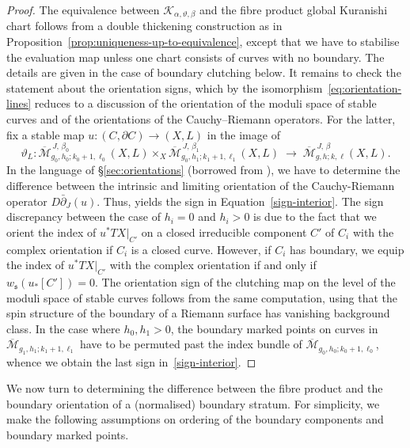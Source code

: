 \documentclass[11pt,psamsfonts, oneside, reqno]{amsart}
\newcommand{\cl}{\colon}
\newcommand{\Mbar}{\overline{\mathcal M}}
\newcommand{\delbar}{\bar\partial}
\newcommand{\del}{\partial}
\newcommand{\cK}{\mathcal{K}}
\newcommand{\fs}{\mathfrak{s}}
\theoremstyle{definition}
\theoremstyle{remark}
\numberwithin{equation}{section}
\begin{document}
\begin{proof} 
	The equivalence between $\cK_{\alpha,\vartheta,\beta}$ and the fibre product global Kuranishi chart follows from a double thickening construction as in Proposition~\ref{prop:uniqueness-up-to-equivalence}, except that we have to stabilise the evaluation map unless one chart consists of curves with no boundary. The details are given in the case of boundary clutching below. It remains to check the statement about the orientation signs, which by the isomorphism~\eqref{eq:orientation-lines} reduces to a discussion of the orientation of the moduli space of stable curves and of the orientations of the Cauchy--Riemann operators. For the latter, fix a stable map $u \cl (C,\del C)\to (X,L)$ in the image of 
	$$ \vartheta_L\cl \Mbar_{g_0,h_0;k_0+1,\ell_0}^{\,J,\,\beta_0}(X,L)\times_X\Mbar_{g_0,h_1;k_1+1,\ell_1}^{\,J,\,\beta_1}(X,L)\;\longrightarrow\;\Mbar^{\,J,\,\beta}_{g,h;k,\ell}(X,L).$$\noindent
	In the language of \S\ref{sec:orientations} (borrowed from \cite{CZ24}), we have to determine the difference between the intrinsic and limiting orientation of the Cauchy-Riemann operator $D\delbar_J(u)$. Thus, \cite[CROrient~7C(1)]{CZ24} yields the sign in Equation~\ref{sign-interior}. The sign discrepancy between the case of $h_i = 0$ and $h_i > 0$ is due to the fact that we orient the index of $u^*TX|_{C'}$ on a closed irreducible component $C'$ of $C_i$ with the complex orientation if $C_i$ is a closed curve. However, if $C_i$ has boundary, we equip the index of $u^*TX|_{C'}$ with the complex orientation if and only if $w_\fs(u_*[C']) = 0$.  The orientation sign of the clutching map on the level of the moduli space of stable curves follows from the same computation, using that the spin structure of the boundary of a Riemann surface has vanishing background class. In the case where $h_0,h_1 > 0$, the boundary marked points on curves in $\Mbar_{g_1,h_1;k_1+1,\ell_1}$ have to be permuted past the index bundle of $\Mbar_{g_0,h_0;k_0+1,\ell_0}$, whence we obtain the last sign in~\eqref{sign-interior}.
\end{proof}


\noindent
We now turn to determining the difference between the fibre product and the boundary orientation of a (normalised) boundary stratum. For simplicity, we make the following assumptions on ordering of the boundary components and boundary marked points.
\end{document}
